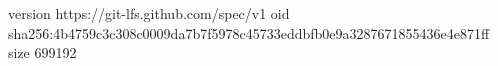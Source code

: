 version https://git-lfs.github.com/spec/v1
oid sha256:4b4759c3c308c0009da7b7f5978c45733eddbfb0e9a3287671855436e4e871ff
size 699192
